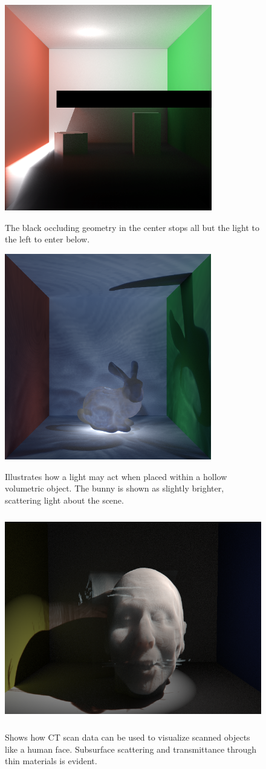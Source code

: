 \documentclass[12pt]{ucthesis}
\newcommand{\captionfonts}{\small\bf\ssp}
\begin{document}
\begin{figure}[h!]
    \centering
    \includegraphics[height=90mm]{img/one_side_corrected.png}
    \captionfonts
    \caption{The black occluding geometry in the center stops all but the light to the left to enter below.}
\end{figure}

\begin{figure}[h!]
    \centering
    \includegraphics[height=90mm]{img/bunny_glow.png}
    \captionfonts
    \caption{Illustrates how a light may act when placed within a hollow volumetric object.  The bunny is shown as slightly brighter, scattering light about the scene.}
\end{figure}

\begin{figure}[h!]
    \centering
    \includegraphics[height=90mm]{img/face1.png}
    \captionfonts
    \caption{Shows how CT scan data can be used to visualize scanned objects like a human face.  Subsurface scattering and transmittance through thin materials is evident.}
\end{figure}
\end{document}
